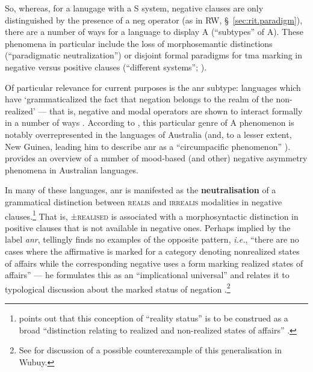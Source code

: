 So, whereas, for a lanugage with a \acrfull{S} system, negative clauses are only distinguished by the presence of a \gls{neg} operator (as in \acrshort{RW}, \S~\ref{sec:rit.paradigm}), there are a number of ways for a language to display \acrfull{A} (``subtypes'' of \acrshort{A}). These phenomena in particular include the loss of morphosemantic distinctions (``paradigmatic neutralization'') or disjoint formal paradigms for \acrshort{tma} marking in negative versus positive clauses (``different systems''; \citeyear[51--5]{Miestamo2005}).

Of particular relevance for current purposes is the \acrshort{anr} subtype: languages which have `grammaticalized the fact that negation belongs to the realm of the non-realized' --- that is, negative and modal operators are shown to interact formally in a number of ways \citet[208]{Miestamo2005}. According to \citeauthor{Miestamo2005}, this particular genre of \acrlong{A} phenomenon is notably overrepresented in the languages of Australia (and, to a lesser extent, New Guinea, leading him to describe \acrshort{anr} as a ``circumpacific phenomenon'' \citeyearpar[192,]{Miestamo2005}).
 \citet[\S2.2]{Phillips2021b} provides an overview of a number of mood-based (and other) negative asymmetry phenomena in Australian languages.


In many of these languages, \acrshort{anr} is manifested as the \textbf{neutralisation} of a grammatical distinction between \textsc{realis} and \textsc{irrealis} modalities in negative clauses.\footnote{\citeauthor{Miestamo2005} points out that this conception of ``reality status'' is to be construed as a broad ``distinction relating to realized and non-realized states of affairs'' \citeyearpar[96]{Miestamo2005}.} That is, ±\textsc{realised} is associated with a morphosyntactic distinction in positive clauses that is not available in negative ones. Perhaps implied by the label \textit{\acrshort{anr}}, \citeauthor{Miestamo2005} tellingly finds no examples of the opposite pattern, \textit{i.e.}, ``there are no cases where the affirmative is marked for a category denoting nonrealized states of affairs while the corresponding negative uses a form marking realized states of affairs'' --- he formulates this as an ``implicational universal'' and relates it to typological discussion about the marked status of negation \citeyearpar[96--7]{Miestamo2005}.\footnote{See \citet[107--8]{Miestamo2005} for discussion of a possible counterexample of this generalisation in Wubuy.}



